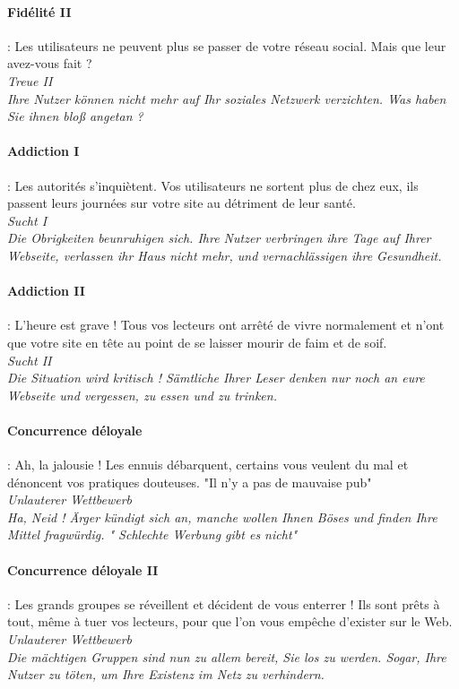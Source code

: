 \documentclass[10pt,a4paper]{article}
\begin{document}
\paragraph{Fidélité II} : Les utilisateurs ne peuvent plus se passer de votre réseau social. Mais que leur avez-vous fait ?\\
\textit{Treue II}\\
\textit{Ihre Nutzer können nicht mehr auf Ihr soziales Netzwerk verzichten. Was haben Sie ihnen bloß angetan ?}


\paragraph{Addiction I} : Les autorités s'inquiètent. Vos utilisateurs ne sortent plus de chez eux, ils passent leurs journées sur votre site au détriment de leur santé.\\
\textit{Sucht I}\\
\textit{Die Obrigkeiten beunruhigen sich. Ihre Nutzer verbringen ihre Tage auf Ihrer Webseite, verlassen ihr Haus nicht mehr, und vernachlässigen ihre Gesundheit.}


\paragraph{Addiction II} : L'heure est grave ! Tous vos lecteurs ont arrêté de vivre normalement et n'ont que votre site en tête au point de se laisser mourir de faim et de soif.\\
\textit{Sucht II}\\
\textit{Die Situation wird kritisch ! Sämtliche Ihrer Leser denken nur noch an eure Webseite und vergessen, zu essen und zu trinken.}


\paragraph{Concurrence déloyale} : Ah, la jalousie ! Les ennuis débarquent, certains vous veulent du mal et dénoncent vos pratiques douteuses. "Il n'y a pas de mauvaise pub"\\
\textit{Unlauterer Wettbewerb}\\
\textit{Ha, Neid ! Ärger kündigt sich an, manche wollen Ihnen Böses und finden Ihre Mittel fragwürdig. " Schlechte Werbung gibt es nicht"}


\paragraph{Concurrence déloyale II} : Les grands groupes se réveillent et décident de vous enterrer ! Ils sont prêts à tout, même à tuer vos lecteurs, pour que l'on vous empêche d'exister sur le Web.\\
\textit{Unlauterer Wettbewerb}\\
\textit{Die mächtigen Gruppen sind nun zu allem bereit, Sie los zu werden. Sogar, Ihre Nutzer zu töten, um Ihre Existenz im Netz zu verhindern.}
\end{document}
